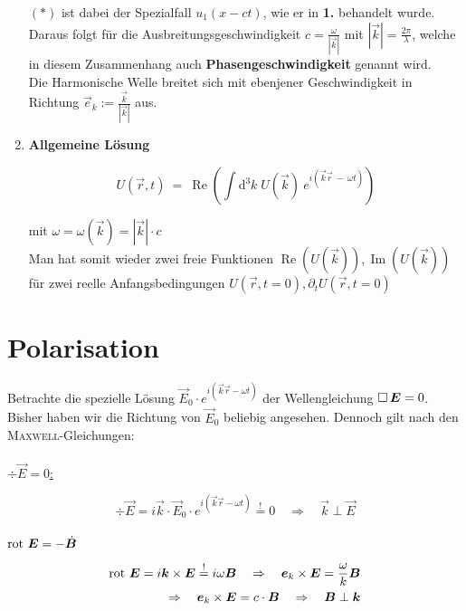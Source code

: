 \begin{enumerate}[label=\textbf{\arabic* .}]
$(*)$ ist dabei der Spezialfall $u_1(x-ct)$, wie er in \textbf{1.} behandelt wurde.\\
Daraus folgt für die Ausbreitungsgeschwindigkeit $c =\frac{\omega}{|\vec{k}|}$ mit $|\vec{k}|=\frac{2\pi}{\lambda}$, welche in diesem Zusammenhang auch \textbf{Phasengeschwindigkeit} genannt wird.\\
Die Harmonische Welle breitet sich mit ebenjener Geschwindigkeit in Richtung $\vec{e}_k := \frac{\vec{k}}{|\vec{k}|}$ aus.

\item \textbf{Allgemeine Lösung}

\begin{equation*}
U(\vec{r},t) \ = \ \operatorname{Re} \left(\int\mathrm{d}^3 k \; U(\vec{k}) \ e^{i(\vec{k}\vec{r} \ - \ \omega t)}\right)
\end{equation*}

mit $\omega = \omega(\vec{k}) = |\vec{k}| \cdot c$\\
Man hat somit wieder zwei freie Funktionen $\operatorname{Re}(U(\vec{k})), \operatorname{Im}(U(\vec{k}))$ für zwei reelle Anfangsbedingungen $U(\vec{r},t=0), \partial_t U(\vec{r},t=0)$

\end{enumerate}


\section{Polarisation}

Betrachte die spezielle Lösung $\vec{E}_0 \cdot e^{i(\vec{k}\vec{r} - \omega t)}$ der Wellengleichung $\mathop{{}\Box}\nolimits \bm{E} = 0$. Bisher haben wir die Richtung von $\vec{E}_0$ beliebig angesehen. Dennoch gilt nach den \textsc{Maxwell}-Gleichungen:\
\\
\ \\
\underline{$\div\vec{E} = 0$:}

\begin{equation*}
\div \vec{E} = i\vec{k}\cdot\vec{E}_0 \cdot e^{i(\vec{k}\vec{r} - \omega t)} \overset{!}{=} 0 \quad \Rightarrow \quad \vec{k}\perp\vec{E}
\end{equation*}
\ \\

\underline{$\text{rot }\bm{E} = - \dot{\bm{B}}$}

\begin{align*}
\text{rot }\bm{E} = i\bm{k}\times\bm{E} \overset{!}{=} i \omega\bm{B} \quad \Rightarrow \quad \bm{e}_k\times\bm{E} = \frac{\omega}{k}\bm{B}\\
\Rightarrow\quad\bm{e}_k\times\bm{E} = c \cdot\bm{B} \quad \Rightarrow \quad \bm{B} \perp \bm{k}
\end{align*}

